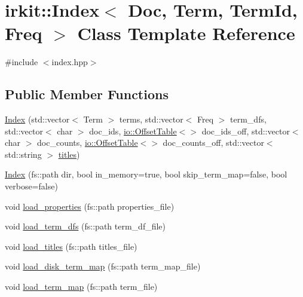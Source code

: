 \hypertarget{classirkit_1_1Index}{}\section{irkit\+:\+:Index$<$ Doc, Term, Term\+Id, Freq $>$ Class Template Reference}
\label{classirkit_1_1Index}


{\ttfamily \#include $<$index.\+hpp$>$}

\subsection*{Public Member Functions}
\begin{DoxyCompactItemize}
\item 
\mbox{\hyperlink{classirkit_1_1Index_aae374f9921cbbb42642e1a8c8f338c75}{Index}} (std\+::vector$<$ Term $>$ terms, std\+::vector$<$ Freq $>$ term\+\_\+dfs, std\+::vector$<$ char $>$ doc\+\_\+ids, \mbox{\hyperlink{classirkit_1_1io_1_1OffsetTable}{io\+::\+Offset\+Table}}$<$$>$ doc\+\_\+ids\+\_\+off, std\+::vector$<$ char $>$ doc\+\_\+counts, \mbox{\hyperlink{classirkit_1_1io_1_1OffsetTable}{io\+::\+Offset\+Table}}$<$$>$ doc\+\_\+counts\+\_\+off, std\+::vector$<$ std\+::string $>$ \mbox{\hyperlink{classirkit_1_1Index_a632caff9525484c5d453d016c5cb586e}{titles}})
\item 
\mbox{\hyperlink{classirkit_1_1Index_a6fade82e666208109ec03fd3409c753b}{Index}} (fs\+::path dir, bool in\+\_\+memory=true, bool skip\+\_\+term\+\_\+map=false, bool verbose=false)
\item 
void \mbox{\hyperlink{classirkit_1_1Index_af518f3df5f1821166be4ea706c30c533}{load\+\_\+properties}} (fs\+::path properties\+\_\+file)
\item 
void \mbox{\hyperlink{classirkit_1_1Index_af8a4dd64292b2b7f7359ef1e62d75147}{load\+\_\+term\+\_\+dfs}} (fs\+::path term\+\_\+df\+\_\+file)
\item 
void \mbox{\hyperlink{classirkit_1_1Index_acd33c3a279e165a71594843d70e281f1}{load\+\_\+titles}} (fs\+::path titles\+\_\+file)
\item 
void \mbox{\hyperlink{classirkit_1_1Index_af4a590ea760157bbb7bb12a6f8df8fe5}{load\+\_\+disk\+\_\+term\+\_\+map}} (fs\+::path term\+\_\+map\+\_\+file)
\item 
void \mbox{\hyperlink{classirkit_1_1Index_a2071c83ea3a4f128ea624fea8a24c9c9}{load\+\_\+term\+\_\+map}} (fs\+::path term\+\_\+file)
\item 

\end{DoxyCompactItemize}
